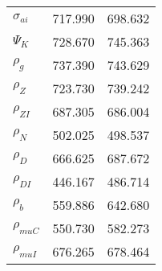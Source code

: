 \begin{center}
\begin{longtable}{lcc}
$ {\sigma_{ai}}        $	 & 	     717.990	 & 	     698.632 \\ 
$ {\Psi_{K}}           $	 & 	     728.670	 & 	     745.363 \\ 
$ {\rho_g}             $	 & 	     737.390	 & 	     743.629 \\ 
$ {\rho_Z}             $	 & 	     723.730	 & 	     739.242 \\ 
$ {\rho_{ZI}}          $	 & 	     687.305	 & 	     686.004 \\ 
$ {\rho_N}             $	 & 	     502.025	 & 	     498.537 \\ 
$ {\rho_D}             $	 & 	     666.625	 & 	     687.672 \\ 
$ {\rho_{DI}}          $	 & 	     446.167	 & 	     486.714 \\ 
$ {\rho_b}             $	 & 	     559.886	 & 	     642.680 \\ 
$ {\rho_{muC}}         $	 & 	     550.730	 & 	     582.273 \\ 
$ {\rho_{muI}}         $	 & 	     676.265	 & 	     678.464 \\ 
\end{longtable}
 \end{center}
